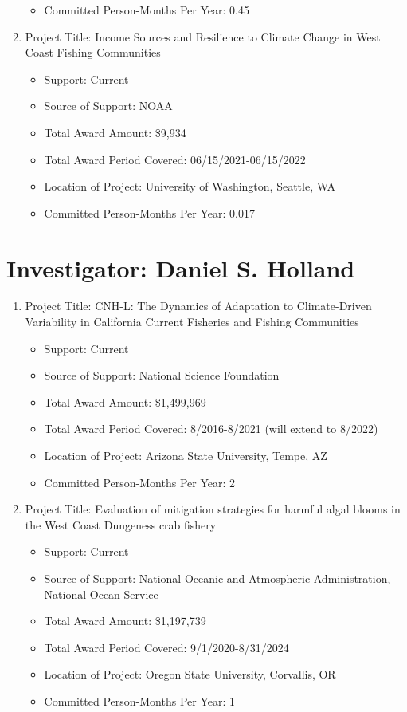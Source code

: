 \documentclass[12pt]{elsarticle}
\begin{document}
\begin{enumerate}
\begin{itemize}
\item Committed Person-Months Per Year: 0.45
\end{itemize}
\item Project Title: Income Sources and Resilience to Climate Change in West Coast Fishing Communities
\begin{itemize}
\item Support: Current
\item Source of Support: NOAA
\item Total Award Amount: \$9,934
\item Total Award Period Covered: 06/15/2021-06/15/2022
\item Location of Project: University of Washington, Seattle, WA
\item Committed Person-Months Per Year: 0.017
\end{itemize}
\end{enumerate}


\section*{Investigator: Daniel S. Holland}

\begin{enumerate}
\item Project Title:  CNH-L:  The Dynamics of Adaptation to Climate-Driven Variability in California Current Fisheries and Fishing Communities   
\begin{itemize}
\item Support: Current
\item Source of Support: National Science Foundation
\item Total Award Amount: \$1,499,969
\item Total Award Period Covered: 8/2016-8/2021 (will extend to 8/2022)
\item Location of Project: Arizona State University, Tempe, AZ
\item Committed Person-Months Per Year: 2
\end{itemize}
\item Project Title: Evaluation of mitigation strategies for harmful algal blooms in the West Coast Dungeness crab fishery
\begin{itemize}
\item Support: Current
\item Source of Support: National Oceanic and Atmospheric Administration, National Ocean Service
\item Total Award Amount: \$1,197,739
\item Total Award Period Covered: 9/1/2020-8/31/2024
\item Location of Project: Oregon State University, Corvallis, OR
\item Committed Person-Months Per Year: 1
\end{itemize}
\end{enumerate}
\end{document}
